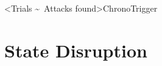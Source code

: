\interlude[2]<Trials \textasciitilde\ Attacks found>{ChronoTrigger}
\section{State Disruption}

\begin{frame}[light]{}
  \vspace{1cm}
  \large
  \vollkorn

  \begin{columns}[fullwidth]
    \begin{column}{.1\linewidth}
    \end{column}

    \begin{column}{.35\linewidth}




\end{column}
\end{columns}
\end{frame}
